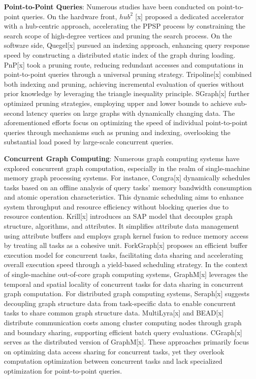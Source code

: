 \documentclass[lettersize,journal]{IEEEtran} %
\begin{document}
{\bf{Point-to-Point Queries}}: 
Numerous studies have been conducted on point-to-point queries. On the hardware front, $hub^2$ [x] proposed a dedicated accelerator with a hub-centric approach, accelerating the PPSP process by constraining the search scope of high-degree vertices and pruning the search process. On the software side, Quegel[x] pursued an indexing approach, enhancing query response speed by constructing a distributed static index of the graph during loading. PnP[x] took a pruning route, reducing redundant accesses and computations in point-to-point queries through a universal pruning strategy. Tripoline[x] combined both indexing and pruning, achieving incremental evaluation of queries without prior knowledge by leveraging the triangle inequality principle. SGraph[x] further optimized pruning strategies, employing upper and lower bounds to achieve sub-second latency queries on large graphs with dynamically changing data. The aforementioned efforts focus on optimizing the speed of individual point-to-point queries through mechanisms such as pruning and indexing, overlooking the substantial load posed by large-scale concurrent queries.

{\bf{Concurrent Graph Computing}}: Numerous graph computing systems have explored concurrent graph computation, especially in the realm of single-machine memory graph processing systems. For instance, Congra[x] dynamically schedules tasks based on an offline analysis of query tasks' memory bandwidth consumption and atomic operation characteristics. This dynamic scheduling aims to enhance system throughput and resource efficiency without blocking queries due to resource contention. Krill[x] introduces an SAP model that decouples graph structure, algorithms, and attributes. It simplifies attribute data management using attribute buffers and employs graph kernel fusion to reduce memory access by treating all tasks as a cohesive unit. ForkGraph[x] proposes an efficient buffer execution model for concurrent tasks, facilitating data sharing and accelerating overall execution speed through a yield-based scheduling strategy. In the context of single-machine out-of-core graph computing systems, GraphM[x] leverages the temporal and spatial locality of concurrent tasks for data sharing in concurrent graph computation. For distributed graph computing systems, Seraph[x] suggests decoupling graph structure data from task-specific data to enable concurrent tasks to share common graph structure data. MultiLyra[x] and BEAD[x] distribute communication costs among cluster computing nodes through graph and boundary sharing, supporting efficient batch query evaluations. CGraph[x] serves as the distributed version of GraphM[x]. These approaches primarily focus on optimizing data access sharing for concurrent tasks, yet they overlook computation optimization between concurrent tasks and lack specialized optimization for point-to-point queries.
\end{document}
